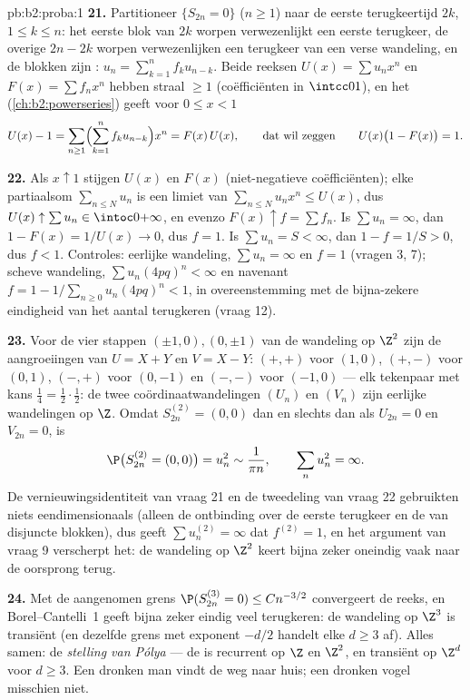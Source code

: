 \begin{solution}{pb:b2:proba:1}
\textbf{21.} Partitioneer $\{S_{2n} = 0\}$ ($n \geq 1$) naar de
eerste terugkeertijd $2k$, $1 \leq k \leq n$: het eerste blok van
$2k$ worpen verwezenlijkt een eerste terugkeer, de overige $2n -
2k$ worpen verwezenlijken een terugkeer van een verse wandeling, en
de blokken zijn : $u_n = \sum_{k=1}^nf_ku_{n-k}$.
Beide reeksen $U(x) = \sum u_nx^n$ en $F(x) = \sum f_nx^n$ hebben
straal $\geq 1$ (coëfficiënten in $\intcc01$), en het
 (\cref{ch:b2:powerseries}) geeft voor $0 \leq x < 1$
\[
U(x) - 1 = \sum_{n\geq1}\Bigl(\sum_{k=1}^n
f_ku_{n-k}\Bigr)x^n = F(x)\,U(x),
\qquad\text{dat wil zeggen}\qquad
U(x)\bigl(1 - F(x)\bigr) = 1 .
\]

\textbf{22.} Als $x \uparrow 1$ stijgen $U(x)$ en $F(x)$
(niet-negatieve coëfficiënten); elke partiaalsom $\sum_{n\leq
N}u_n$ is een limiet van $\sum_{n\leq N}u_nx^n \leq U(x)$, dus
$U(x) \uparrow \sum u_n \in \intoc0{+\infty}$, en evenzo $F(x)
\uparrow f = \sum f_n$. Is $\sum u_n = \infty$, dan $1 - F(x) =
1/U(x) \to 0$, dus $f = 1$. Is $\sum u_n = S < \infty$, dan $1 - f
= 1/S > 0$, dus $f < 1$. Controles: eerlijke wandeling, $\sum u_n =
\infty$ en $f = 1$ (vragen 3, 7); scheve wandeling, $\sum
u_n(4pq)^n < \infty$ en navenant $f = 1 -
1/\sum_{n\geq0}u_n(4pq)^n < 1$, in overeenstemming met de
bijna-zekere eindigheid van het aantal terugkeren (vraag 12).

\textbf{23.} Voor de vier stappen $(\pm1, 0), (0, \pm1)$ van de
wandeling op $\Z^2$ zijn de aangroeiingen van $U = X + Y$ en $V = X
- Y$: $(+,+)$ voor $(1,0)$, $(+,-)$ voor $(0,1)$, $(-,+)$ voor
$(0,-1)$ en $(-,-)$ voor $(-1,0)$ --- elk tekenpaar met kans
$\frac14 = \frac12\cdot\frac12$: de twee coördinaatwandelingen
$(U_n)$ en $(V_n)$ zijn  eerlijke wandelingen op
$\Z$. Omdat $S^{(2)}_{2n} = (0,0)$ dan en slechts dan als $U_{2n} =
0$ en $V_{2n} = 0$, is
\[
\P\bigl(S^{(2)}_{2n} = (0,0)\bigr) = u_n^2 \sim \frac1{\pi
n}, \qquad \sum_nu_n^2 = \infty .
\]
De vernieuwingsidentiteit van vraag 21 en de tweedeling van vraag
22 gebruikten niets eendimensionaals (alleen de ontbinding over de
eerste terugkeer en de  van disjuncte blokken),
dus geeft $\sum u_n^{(2)} = \infty$ dat $f^{(2)} = 1$, en het
argument van vraag 9 verscherpt het: de wandeling op $\Z^2$ keert
bijna zeker oneindig vaak naar de oorsprong terug.

\textbf{24.} Met de aangenomen grens $\P(S^{(3)}_{2n} = 0) \leq
Cn^{-3/2}$ convergeert de reeks, en Borel--Cantelli~1 geeft bijna
zeker eindig veel terugkeren: de wandeling op $\Z^3$ is transiënt
(en dezelfde grens met exponent $-d/2$ handelt elke $d \geq 3$ af).
Alles samen: de \emph{stelling van Pólya} --- de  is recurrent op $\Z$ en $\Z^2$, en transiënt op
$\Z^d$ voor $d \geq 3$. Een dronken man vindt de weg naar huis; een
dronken vogel misschien niet.


\end{solution}
